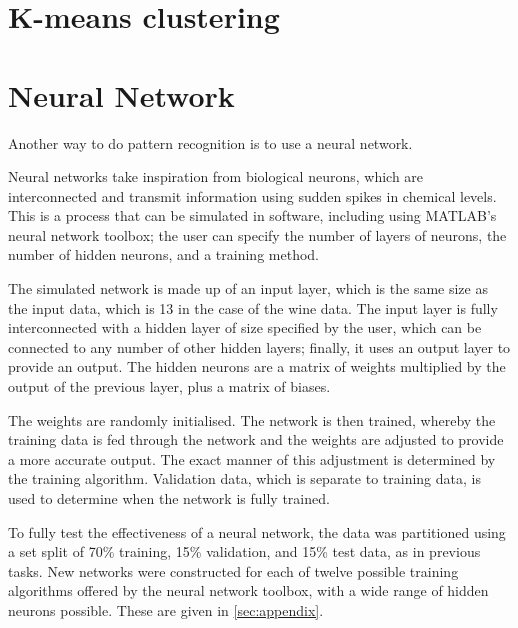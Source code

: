 \documentclass[a4paper, 10pt, conference]{ieeeconf}
\begin{document}
\section{K-means clustering}

\section{Neural Network}


Another way to do pattern recognition is to use a neural network.

Neural networks take inspiration from biological neurons, which are interconnected and transmit information using sudden spikes in chemical levels. This is a process that can be simulated in software, including using MATLAB's neural network toolbox; the user can specify the number of layers of neurons, the number of hidden neurons, and a training method.

The simulated network is made up of an input layer, which is the same size as the input data, which is 13 in the case of the wine data. The input layer is fully interconnected with a hidden layer of size specified by the user, which can be connected to any number of other hidden layers; finally, it uses an output layer to provide an output. The hidden neurons are a matrix of weights multiplied by the output of the previous layer, plus a matrix of biases. 

The weights are randomly initialised. The network is then trained, whereby the training data is fed through the network and the weights are adjusted to provide a more accurate output. The exact manner of this adjustment is determined by the training algorithm. Validation data, which is separate to training data, is used to determine when the network is fully trained.

To fully test the effectiveness of a neural network, the data was partitioned using a set split of  70\% training, 15\% validation, and 15\% test data, as in previous tasks. New networks were constructed for each of twelve possible training algorithms offered by the neural network toolbox, with a wide range of hidden neurons possible. These are given in \ref{sec:appendix}.
\end{document}

